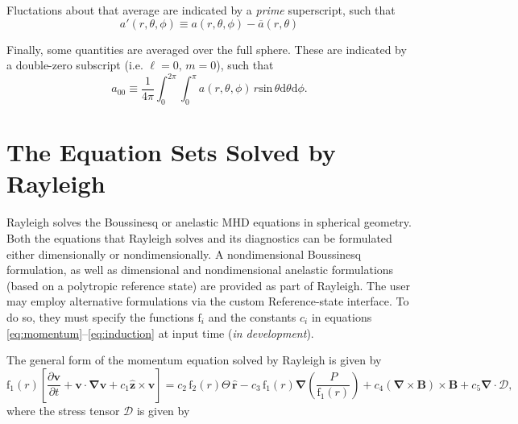 \documentclass[10pt,letterpaper]{article}
\newcommand{\ff}{\mathrm{f}}
\begin{document}

Fluctations about that average are indicated by a \textit{prime} superscript, such that
\begin{equation}
	\label{eq:prime}
	a'(r,\theta,\phi)\equiv a(r,\theta,\phi)-\overline{a}(r,\theta)
\end{equation}

Finally, some quantities are averaged over the full sphere.  These are indicated by a double-zero subscript (i.e. $\ell=0,\,m=0$), such that
\begin{equation}
\label{eq:fullsph}
a_{00}\equiv \frac{1}{4\pi}\int_{0}^{2\pi}\int_{0}^{\pi} a(r,\theta,\phi)\, r\mathrm{sin}\,\theta\mathrm{d}\theta\mathrm{d}\phi.
\end{equation}


\section{The Equation Sets Solved by Rayleigh}
Rayleigh solves the Boussinesq or anelastic MHD equations in spherical geometry.  Both the equations that Rayleigh solves and its diagnostics can be formulated either dimensionally or nondimensionally.  A nondimensional Boussinesq formulation, as well as dimensional and nondimensional anelastic formulations (based on a polytropic reference state) are provided as part of Rayleigh.  The user may employ alternative formulations via the custom Reference-state interface.  To do so, they must specify the functions $\ff_i$ and the constants $c_i$ in equations \ref{eq:momentum}--\ref{eq:induction} at input time (\textit{in development}).   

The general form of the momentum equation solved by Rayleigh is given by
\begin{equation}
	\label{eq:momentum}
	\ff_1(r)\left[\frac{\partial \boldsymbol{v}}{\partial t} +\boldsymbol{v}\cdot\boldsymbol{\nabla}\boldsymbol{v}  %
	+c_1\boldsymbol{\hat{z}}\times\boldsymbol{v} \right]  = %
	c_2\,\ff_2(r)\Theta\,\boldsymbol{\hat{r}} %
	-c_3\,\ff_1(r)\boldsymbol{\nabla}\left(\frac{P}{\ff_1(r)}\right) %
	+c_4\left(\boldsymbol{\nabla}\times\boldsymbol{B}\right)\times\boldsymbol{B} %
	+c_5\boldsymbol{\nabla}\cdot\boldsymbol{\mathcal{D}},
\end{equation}
where the stress tensor $\mathcal{D}$ is given by
\end{document}
